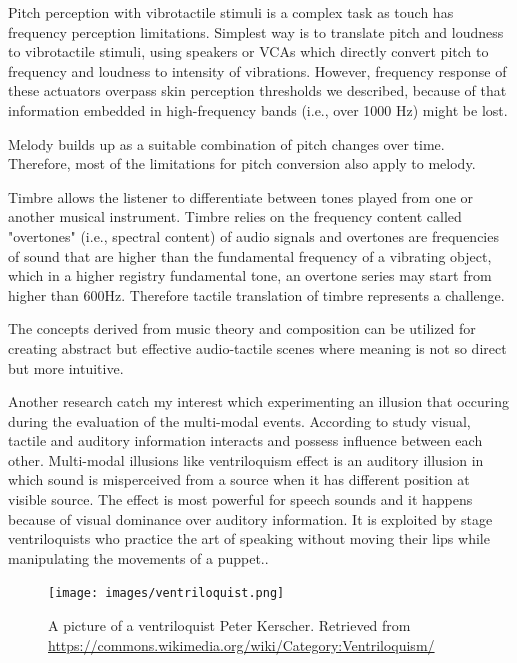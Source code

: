             Pitch perception with vibrotactile stimuli is a complex task as touch has frequency perception limitations. Simplest way is to translate pitch and loudness to vibrotactile stimuli, using speakers or VCAs which directly convert pitch to frequency and loudness to intensity of vibrations. However, frequency response of these actuators overpass skin perception thresholds we described, because of that information embedded in high-frequency bands (i.e., over 1000 Hz) might be lost.\par

            Melody builds up as a suitable combination of pitch changes over time. Therefore, most of the limitations for pitch conversion also apply to melody.\par

            Timbre allows the listener to differentiate between tones played from one or another musical instrument. Timbre relies on the frequency content called "overtones" (i.e., spectral content) of audio signals and overtones are frequencies of sound that are higher than the fundamental frequency of a vibrating object, which in a higher registry fundamental tone, an overtone series may start from higher than 600Hz. Therefore tactile translation of timbre represents a challenge.\par

            The concepts derived from music theory and composition can be utilized for creating abstract but effective audio-tactile scenes where meaning is not so direct but more intuitive.\par

            Another research\cite{Touch_the_Sound} catch my interest which experimenting an illusion that occuring during the evaluation of the multi-modal events. According to study visual, tactile and auditory information interacts and possess influence between each other. Multi-modal illusions like ventriloquism effect is an auditory illusion in which sound is misperceived from a source when it has different position at visible source. The effect is most powerful for speech sounds and it happens because of visual dominance over auditory information. It is exploited by stage ventriloquists who practice the art of speaking without moving their lips while manipulating the movements of a puppet.\cite{Touch_the_Sound}.\par
            
            \begin{figure}[H]
                \centering
                \texttt{[image: images/ventriloquist.png]}
                \caption{A picture of a ventriloquist Peter Kerscher. Retrieved from \url{https://commons.wikimedia.org/wiki/Category:Ventriloquism/}}
                \label{fig:VENTRILOQUIST}
            \end{figure}

